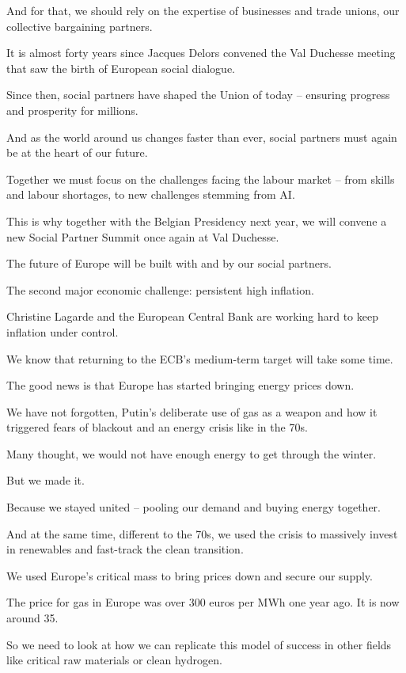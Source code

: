 \documentclass[a4paper,11pt]{article}
\begin{document}
And for that, we should rely on the expertise of businesses and trade unions, our collective bargaining partners. 

It is almost forty years since Jacques Delors convened the Val Duchesse meeting that saw the birth of European social dialogue. 

Since then, social partners have shaped the Union of today – ensuring progress and prosperity for millions.

And as the world around us changes faster than ever, social partners must again be at the heart of our future. 

Together we must focus on the challenges facing the labour market – from skills and labour shortages, to new challenges stemming from AI. 

This is why together with the Belgian Presidency next year, we will convene a new Social Partner Summit once again at Val Duchesse. 

The future of Europe will be built with and by our social partners. 

 

The second major economic challenge: persistent high inflation.

Christine Lagarde and the European Central Bank are working hard to keep inflation under control.

We know that returning to the ECB's medium-term target will take some time.

The good news is that Europe has started bringing energy prices down.

We have not forgotten, Putin's deliberate use of gas as a weapon and how it triggered fears of blackout and an energy crisis like in the 70s.

Many thought, we would not have enough energy to get through the winter.

But we made it.

Because we stayed united – pooling our demand and buying energy together.

And at the same time, different to the 70s, we used the crisis to massively invest in renewables and fast-track the clean transition.

We used Europe's critical mass to bring prices down and secure our supply.

The price for gas in Europe was over 300 euros per MWh one year ago. It is now around 35.

So we need to look at how we can replicate this model of success in other fields like critical raw materials or clean hydrogen.
\end{document}
